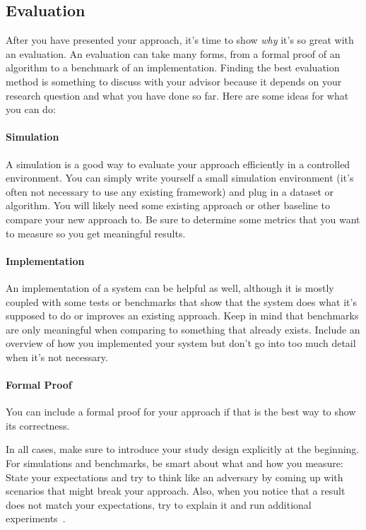 \documentclass[a4]{article}
\begin{document}
\subsection{Evaluation}

After you have presented your approach, it's time to show \emph{why} it's so great with an evaluation.
An evaluation can take many forms, from a formal proof of an algorithm to a benchmark of an implementation.
Finding the best evaluation method is something to discuss with your advisor because it depends on your research question and what you have done so far.
Here are some ideas for what you can do:

\paragraph{Simulation}
A simulation is a good way to evaluate your approach efficiently in a controlled environment.
You can simply write yourself a small simulation environment (it's often not necessary to use any existing framework) and plug in a dataset or algorithm.
You will likely need some existing approach or other baseline to compare your new approach to.
Be sure to determine some metrics that you want to measure so you get meaningful results.

\paragraph{Implementation}
An implementation of a system can be helpful as well, although it is mostly coupled with some tests or benchmarks that show that the system does what it's supposed to do or improves an existing approach.
Keep in mind that benchmarks are only meaningful when comparing to something that already exists.
Include an overview of how you implemented your system but don't go into too much detail when it's not necessary.

\paragraph{Formal Proof}
You can include a formal proof for your approach if that is the best way to show its correctness.

In all cases, make sure to introduce your study design explicitly at the beginning.
For simulations and benchmarks, be smart about what and how you measure:
State your expectations and try to think like an adversary by coming up with scenarios that might break your approach.
Also, when you notice that a result does not match your expectations, try to explain it and run additional experiments~\cite{mhandley-twitter}.
\end{document}

